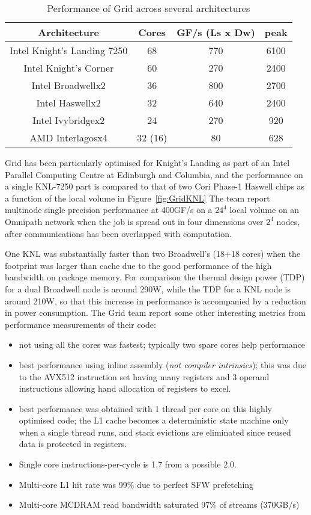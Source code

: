 \documentclass{PoS}
\begin{document}
\begin{table}[hbt]
\begin{tabular}{cccc}
Architecture & Cores & GF/s (Ls x Dw) & peak\\
\hline
Intel Knight's Landing 7250   & 68 & 770 & 6100 \\
Intel Knight's Corner & 60 & 270  & 2400\\
\hline
Intel Broadwellx2 & 36 & 800  & 2700\\
Intel Haswellx2   & 32 & 640  & 2400\\
Intel Ivybridgex2 & 24 & 270 & 920\\
AMD Interlagosx4 & 32 (16) & 80 & 628\\
\hline
\end{tabular}
\caption{\label{tab:Grid} Performance of Grid across several architectures}
\end{table}
Grid has been particularly optimised for Knight's Landing as part of an Intel Parallel Computing
Centre at Edinburgh and Columbia, and the performance on a single KNL-7250 part is compared
to that of two Cori Phase-1 Haswell chips as a function of the local volume in Figure~\ref{fig:GridKNL}
The team report multinode single precision performance at 400GF/s on a $24^4$ local volume on an Omnipath network when
the job is spread out in four dimensions over $2^4$ nodes, after communications has been overlapped with computation.

One KNL was substantially faster than two Broadwell's (18+18 cores) when the footprint was larger than cache due to
the good performance of the high bandwidth on package memory.
For comparison the thermal design power (TDP)
for a dual Broadwell node is around 290W, while the TDP for a KNL node is around 210W, so that this increase in performance is accompanied by a
reduction in power consumption.
The Grid team report some other interesting metrics from performance measurements of their code:
\begin{itemize}
\itemsep-0.2em 
\item not using all the cores was fastest; typically two spare cores help performance
\item best performance using inline assembly (\emph{not compiler intrinsics}); this was due to the 
AVX512 instruction set having many registers and 3 operand instructions allowing hand allocation of registers
to excel. 
\item best performance was obtained with 1 thread per core on this highly optimised code; the L1 cache becomes
a deterministic state machine only when a single thread runs, and stack evictions are eliminated since reused data is 
protected in registers.
\item Single core instructions-per-cycle is 1.7 from a possible 2.0.
\item Multi-core L1 hit rate was 99\% due to perfect SFW prefetching
\item Multi-core MCDRAM read bandwidth saturated 97\% of streams (370GB/s)
\end{itemize}
\end{document}
